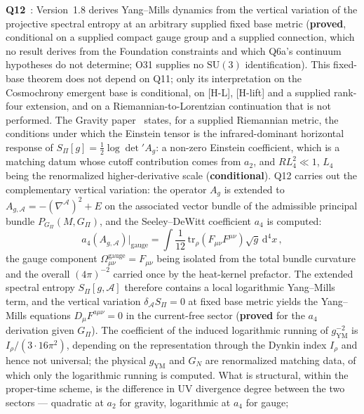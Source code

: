 \documentclass[11pt,a4paper]{article}
\newcommand{\SU}{\mathrm{SU}}
\newcommand{\sproved}{\textcolor{cproved}{\textbf{proved}}}
\newcommand{\scond}{\textcolor{ccond}{\textbf{conditional}}}
\begin{document}
    \textbf{Q12}~\cite{Beau2026q12}: Version~1.8 derives Yang--Mills dynamics from the vertical
    variation of the projective spectral entropy at an arbitrary supplied fixed base metric
    (\sproved, conditional on a supplied compact gauge group and a supplied connection, which no result
    derives from the Foundation constraints and which Q6a's continuum hypotheses do not determine;
    O31 supplies no $\SU(3)$ identification). This fixed-base theorem does not depend on Q11;
    only its interpretation on the Cosmochrony emergent base is conditional, on [H-L], [H-lift] and a supplied
    rank-four extension, and on a
    Riemannian-to-Lorentzian continuation that is not performed.
    The Gravity paper~\cite{Beau2026h} states, for a supplied Riemannian metric, the conditions under which the
    Einstein tensor is the infrared-dominant horizontal response of $S_\Pi[g] = \tfrac{1}{2}\log\det' A_g$: a
    non-zero Einstein coefficient, which is a matching datum whose cutoff contribution comes from $a_2$, and
    $R L_4^2 \ll 1$, $L_4$ being the renormalized higher-derivative scale (\scond).
    Q12 carries out the complementary vertical variation: the operator $A_g$ is extended to
    $A_{g,\mathcal{A}} = -(\nabla^\mathcal{A})^2 + E$ on the associated vector bundle of the
    admissible principal bundle $P_{G_\Pi}(M, G_\Pi)$, and the Seeley--DeWitt coefficient $a_4$
    is computed:
    \[
      a_4(A_{g,\mathcal{A}})\big|_{\mathrm{gauge}}
      = \int \frac{1}{12}\,\mathrm{tr}_\rho(F_{\mu\nu}F^{\mu\nu})
      \sqrt{g}\,\mathrm{d}^4 x\,,
    \]
    the gauge component $\Omega^{\mathrm{gauge}}_{\mu\nu} = F_{\mu\nu}$ being isolated from the
    total bundle curvature and the overall $(4\pi)^{-2}$ carried once by the heat-kernel prefactor.
    The extended spectral entropy $S_\Pi[g,\mathcal{A}]$ therefore contains a local logarithmic
    Yang--Mills term, and the vertical variation $\delta_\mathcal{A}S_\Pi = 0$ at fixed base metric
    yields the Yang--Mills equations $D_\mu F^{a\mu\nu} = 0$ in the current-free sector
    (\sproved{} for the $a_4$ derivation given $G_\Pi$).
    The coefficient of the induced logarithmic running of $g_{\mathrm{YM}}^{-2}$ is
    $I_\rho/(3\cdot 16\pi^2)$, depending on the representation through the Dynkin index $I_\rho$
    and hence not universal; the physical $g_{\mathrm{YM}}$ and $G_N$ are renormalized matching
    data, of which only the logarithmic running is computed.
    What is structural, within the proper-time scheme, is the difference in UV divergence degree
    between the two sectors --- quadratic at $a_2$ for gravity, logarithmic at $a_4$ for gauge;
\end{document}
